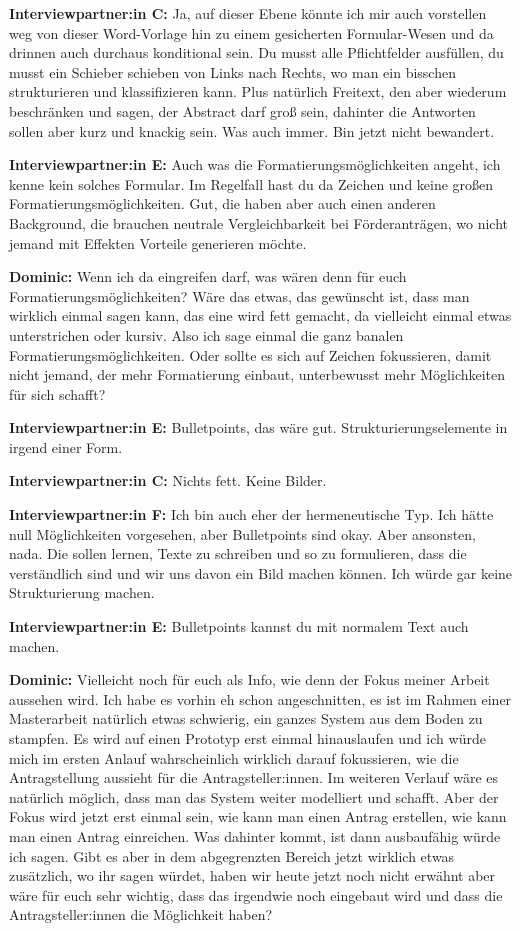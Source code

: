\documentclass[a4paper,12pt,twoside,numbers=noendperiod]{scrreprt}
\begin{document}
\textbf{Interviewpartner:in C:} Ja, auf dieser Ebene könnte ich mir auch vorstellen weg von dieser Word-Vorlage hin zu einem gesicherten Formular-Wesen und da drinnen auch durchaus konditional sein. Du musst alle Pflichtfelder ausfüllen, du musst ein Schieber schieben von Links nach Rechts, wo man ein bisschen strukturieren und klassifizieren kann. Plus natürlich Freitext, den aber wiederum beschränken und sagen, der Abstract darf groß sein, dahinter die Antworten sollen aber kurz und knackig sein. Was auch immer. Bin jetzt nicht bewandert.

\textbf{Interviewpartner:in E:} Auch was die Formatierungsmöglichkeiten angeht, ich kenne kein solches Formular. Im Regelfall hast du da Zeichen und keine großen Formatierungsmöglichkeiten. Gut, die haben aber auch einen anderen Background, die brauchen neutrale Vergleichbarkeit bei Förderanträgen, wo nicht jemand mit Effekten Vorteile generieren möchte.

\textbf{Dominic:} Wenn ich da eingreifen darf, was wären denn für euch Formatierungsmöglichkeiten? Wäre das etwas, das gewünscht ist, dass man wirklich einmal sagen kann, das eine wird fett gemacht, da vielleicht einmal etwas unterstrichen oder kursiv. Also ich sage einmal die ganz banalen Formatierungsmöglichkeiten. Oder sollte es sich auf Zeichen fokussieren, damit nicht jemand, der mehr Formatierung einbaut, unterbewusst mehr Möglichkeiten für sich schafft?

\textbf{Interviewpartner:in E:} Bulletpoints, das wäre gut. Strukturierungselemente in irgend einer Form.

\textbf{Interviewpartner:in C:} Nichts fett. Keine Bilder.

\textbf{Interviewpartner:in F:} Ich bin auch eher der hermeneutische Typ. Ich hätte null Möglichkeiten vorgesehen, aber Bulletpoints sind okay. Aber ansonsten, nada. Die sollen lernen, Texte zu schreiben und so zu formulieren, dass die verständlich sind und wir uns davon ein Bild machen können. Ich würde gar keine Strukturierung machen.

\textbf{Interviewpartner:in E:} Bulletpoints kannst du mit normalem Text auch machen.

\textbf{Dominic:} Vielleicht noch für euch als Info, wie denn der Fokus meiner Arbeit aussehen wird. Ich habe es vorhin eh schon angeschnitten, es ist im Rahmen einer Masterarbeit natürlich etwas schwierig, ein ganzes System aus dem Boden zu stampfen. Es wird auf einen Prototyp erst einmal hinauslaufen und ich würde mich im ersten Anlauf wahrscheinlich wirklich darauf fokussieren, wie die Antragstellung aussieht für die Antragsteller:innen. Im weiteren Verlauf wäre es natürlich möglich, dass man das System weiter modelliert und schafft. Aber der Fokus wird jetzt erst einmal sein, wie kann man einen Antrag erstellen, wie kann man einen Antrag einreichen. Was dahinter kommt, ist dann ausbaufähig würde ich sagen. Gibt es aber in dem abgegrenzten Bereich jetzt wirklich etwas zusätzlich, wo ihr sagen würdet, haben wir heute jetzt noch nicht erwähnt aber wäre für euch sehr wichtig, dass das irgendwie noch eingebaut wird und dass die Antragsteller:innen die Möglichkeit haben?
\end{document}
